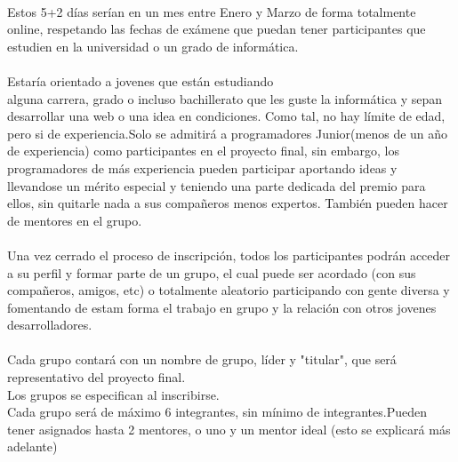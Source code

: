 \documentclass[a4paper]{article}
\begin{document}
    \paragraph{}
    Estos 5+2 días serían en un mes entre Enero y Marzo de forma totalmente
    online, respetando las fechas de exámene que puedan tener participantes que 
    estudien en la universidad o un grado de informática.
    \paragraph{}
    Estaría orientado a jovenes que están estudiando\\ alguna carrera,
    grado o incluso bachillerato que les guste la informática y 
    sepan desarrollar una web o una idea en condiciones. Como tal, no 
    hay límite de edad, pero si de experiencia.Solo se admitirá a 
    programadores Junior(menos de un año de experiencia)
    como participantes en el proyecto final,
    sin embargo, los programadores de más experiencia pueden 
    participar aportando ideas y llevandose un mérito especial y
    teniendo una parte dedicada del premio para ellos, sin quitarle 
    nada a sus compañeros menos expertos. También pueden hacer de 
    mentores en el grupo.
    \paragraph{}
    Una vez cerrado el proceso de inscripción, todos los participantes
    podrán acceder a su perfil y formar parte de un grupo, el cual puede 
    ser acordado (con sus compañeros, amigos, etc) o totalmente aleatorio
    participando con gente diversa y fomentando de estam forma 
    el trabajo en grupo y la relación con otros jovenes desarrolladores.
    \paragraph{}
    Cada grupo contará con un nombre de grupo, líder y "titular", que 
    será representativo del proyecto final.\\Los grupos se especifican al inscribirse.\\
    Cada grupo será de máximo 6 integrantes, sin mínimo de integrantes.Pueden 
    tener asignados hasta 2 mentores, o uno y un mentor ideal (esto se explicará más adelante)
\end{document}
